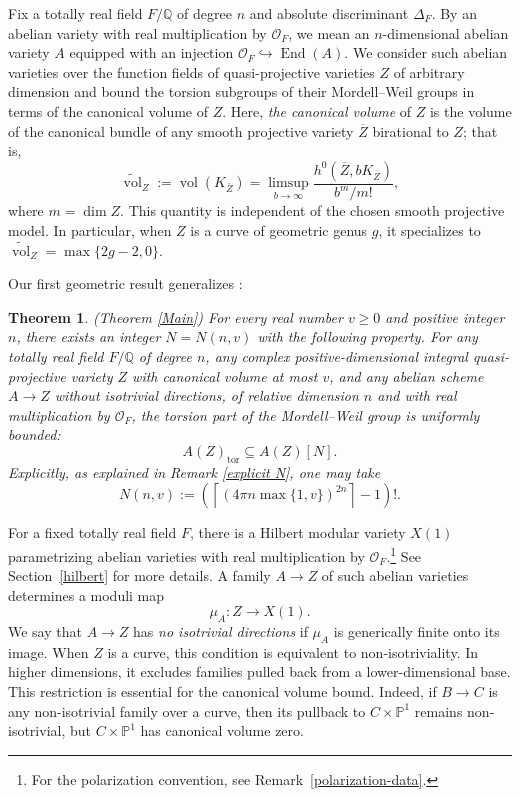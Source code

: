 \documentclass[12 pt]{amsart}
\newtheorem{theorem}{Theorem}[section]
\theoremstyle{definition}
\begin{document}
Fix a totally
real field \(F/\mathbb{Q}\) of degree \(n\) and absolute discriminant \(\Delta_F\). By an abelian variety with real
multiplication by \(\mathcal{O}_F\), we mean an \(n\)-dimensional abelian
variety \(A\) equipped with an injection $\mathcal{O}_F\hookrightarrow\operatorname{End}(A).$
We consider such abelian varieties over the function fields of
quasi-projective varieties \(Z\) of arbitrary dimension and bound the torsion
subgroups of their Mordell--Weil groups in terms of the canonical volume of
\(Z\). Here, \emph{the canonical volume} of \(Z\) is the volume of the
canonical bundle of any smooth projective variety \(\overline{Z}\) birational
to \(Z\); that is,
\[
\widetilde{\operatorname{vol}}_{Z}
:=
\operatorname{vol}(K_{\overline{Z}})
=
\limsup_{b\to\infty}
\frac{h^0(\overline{Z},bK_{\overline{Z}})}{b^m/m!},
\]
 where \(m=\dim Z\). This quantity is independent of the chosen smooth projective model. In particular,  when
\(Z\) is a curve of geometric genus \(g\), it specializes to
\(
\widetilde{\operatorname{vol}}_{Z}
=
\max\{2g-2,0\}.
\)

Our first geometric result
generalizes \cite[Theorem~A]{bakker2018geometric}:
\renewcommand*{\thetheorem}{\Alph{theorem}}
\begin{theorem}\label{Canonical vol}(Theorem \ref{Main})
For every real number \(v\geq 0\) and positive integer \(n\), there exists
an integer \(N=N(n,v)\) with the following property. For any totally real field
\(F/\mathbb Q\) of degree \(n\), any complex positive-dimensional integral
quasi-projective variety \(Z\) with canonical volume at most \(v\), and
any abelian scheme \(A\to Z\) without isotrivial directions, of relative
dimension \(n\) and with real multiplication by \(\mathcal O_F\), the
torsion part of the Mordell--Weil group is uniformly bounded:
\[
A(Z)_{\mathrm{tor}}\subseteq A(Z)[N].
\]
Explicitly, as explained in Remark \ref{explicit N}, one may take
\[N(n,v):=
\left(
\left\lceil
\left(4\pi n\max\{1,v\}\right)^{2n}
\right\rceil-1
\right)!.\]
\end{theorem}


For a fixed totally real field \(F\), there is a Hilbert modular variety
\(X(1)\) parametrizing abelian varieties with real multiplication by
\(\mathcal O_F\).\footnote{For the polarization convention, see Remark~\ref{polarization-data}.} See Section~\ref{hilbert} for more details. A family
\(A\to Z\) of such abelian varieties determines a moduli map
\[
\mu_A\colon Z\longrightarrow X(1).
\]
We say that \(A\to Z\) has \emph{no isotrivial directions} if
\(\mu_A\) is generically finite onto its image. When \(Z\) is a curve,
this condition is equivalent to non-isotriviality. In higher dimensions,
it excludes families pulled back from a lower-dimensional base. This restriction is essential for the canonical volume bound. Indeed, if \(B\to C\) is any non-isotrivial family over a curve, then its pullback to \(C\times\mathbb P^1\) remains non-isotrivial, but \(C\times\mathbb P^1\) has canonical volume zero.
\end{document}
